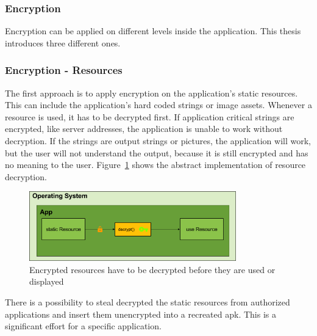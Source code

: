 \subsubsection{Encryption} \label{subsection:counter-replace-encryption-content}
Encryption can be applied on different levels inside the application.
This thesis introduces three different ones.

\subsubsection{Encryption - Resources} \label{subsection:counter-replace-encryption-content-resource}
The first approach is to apply encryption on the application's static resources.
This can include the application's hard coded strings or image assets.
Whenever a resource is used, it has to be decrypted first.
\newline
If application critical strings are encrypted, like server addresses, the application is unable to work without decryption.
If the strings are output strings or pictures, the application will work, but the user will not understand the output, because it is still encrypted and has no meaning to the user.
\newline
Figure~\ref{fig:encryptionResource} shows the abstract implementation of resource decryption.
\begin{figure}[h]
    \centering
    \includegraphics[width=0.8\textwidth]{data/encryptionResource.png}
    \caption{Encrypted resources have to be decrypted before they are used or displayed}
    \label{fig:encryptionResource}
\end{figure}
\newpage
There is a possibility to steal decrypted the static resources from authorized applications and insert them unencrypted into a recreated \gls{apk}.
This is a significant effort for a specific application.

